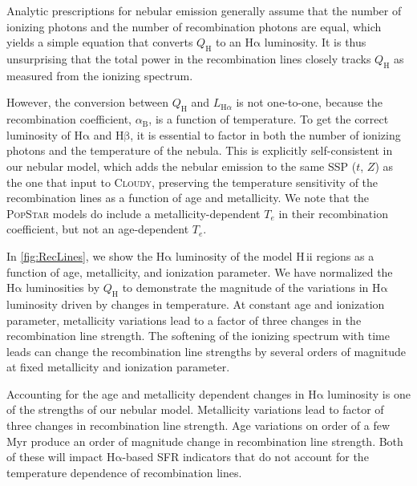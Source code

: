 \documentclass[trackchanges, twocolumn, tighten]{aastex61}
\newcommand{\Fig}[1]{\autoref{fig:#1}}
\newcommand{\Popstar}{\textsc{PopStar}\xspace}
\newcommand{\Cloudy}{\textsc{Cloudy}\xspace}
\newcommand{\Te}{\ensuremath{T_{e}}}
\newcommand{\ha}{\ensuremath{\mathrm{H\alpha}}}
\newcommand{\hb}{\ensuremath{\mathrm{H\beta}}}
\newcommand{\hii}{H\,{\sc ii}\xspace}
\newcommand{\QH}{\ensuremath{Q_{\mathrm{H}}}}
\begin{document}
Analytic prescriptions for nebular emission generally assume that the number of ionizing photons and the number of recombination photons are equal, which yields a simple equation that converts \QH{} to an \ha{} luminosity. It is thus unsurprising that the total power in the recombination lines closely tracks \QH{} as measured from the ionizing spectrum.

However, the conversion between \QH{} and $L_{\mathrm{H}\alpha}$ is not one-to-one, because the recombination coefficient, $\alpha_{\mathrm{B}}$, is a function of temperature. To get the correct luminosity of \ha{} and \hb{}, it is essential to factor in both the number of ionizing photons and the temperature of the nebula. This is explicitly self-consistent in our nebular model, which adds the nebular emission to the same SSP ($t$, $Z$) as the one that input to \Cloudy, preserving the temperature sensitivity of the recombination lines as a function of age and metallicity. We note that the \Popstar models do include a metallicity-dependent \Te{} in their recombination coefficient, but not an age-dependent \Te{}.

In \Fig{RecLines}, we show the \ha{} luminosity of the model \hii regions as a function of age, metallicity, and ionization parameter. We have normalized the \ha{} luminosities by \QH{} to demonstrate the magnitude of the variations in \ha{} luminosity driven by changes in temperature. At constant age and ionization parameter, metallicity variations lead to a factor of three changes in the recombination line strength. The softening of the ionizing spectrum with time leads can change the recombination line strengths by several orders of magnitude at fixed metallicity and ionization parameter. 

Accounting for the age and metallicity dependent changes in \ha{} luminosity is one of the strengths of our nebular model. Metallicity variations lead to factor of three changes in recombination line strength. Age variations on order of a few Myr produce an order of magnitude change in recombination line strength. Both of these will impact \ha-based SFR indicators that do not account for the temperature dependence of recombination lines.
\end{document}
